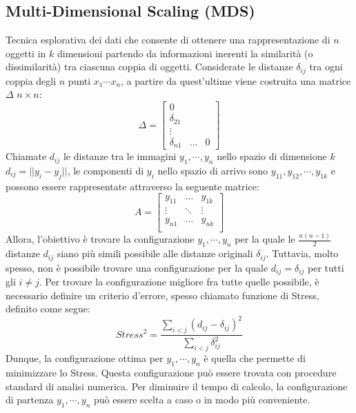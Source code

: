 \documentclass[11pt,a4paper,twocolumn]{article}
\begin{document}
\subsection{Multi-Dimensional Scaling (MDS)}
Tecnica esplorativa dei dati che consente di ottenere una rappresentazione di $n$ oggetti in $k$ dimensioni partendo da informazioni inerenti la similarità (o dissimilarità) tra  ciascuna coppia di oggetti. Considerate le distanze $ \delta_{ij} $ tra ogni coppia degli $n$ punti $x_1 \cdots x_n$, a partire da quest'ultime viene costruita una matrice $\Delta$ $n \times n$:
\begin{equation}
\nonumber
\Delta=\begin{bmatrix}
0\\
\delta_{21}  \\
\vdots   \\
\delta_{n1} & \dots & 0
\end{bmatrix}
\end{equation}
Chiamate $d_{ij}$ le distanze tra le immagini $ y_{1},\cdots,y_{n}$ nello spazio di dimensione $k$ $d_{ij}=\lvert\lvert{y_i-y_j}\lvert\lvert$, le componenti di $y_i$ nello spazio di arrivo sono $y_{11},y_{12},\cdots,y_{1k}$ e possono essere rappresentate attraverso la seguente matrice:
\begin{equation}
\nonumber
A = \begin{bmatrix}
y_{11}           & \dots         & y_{1k}         \\
\vdots   &  \ddots    & \vdots \\
y_{n1}          & \dots         & y_{nk}         \\
\end{bmatrix}
\end{equation}
Allora, l'obiettivo è trovare la configurazione $y_{1},\cdots,y_{n}$ per la quale le $\frac{n(n-1)}{2}$ distanze $d_{ij}$ siano più simili possibile alle distanze originali $\delta_{ij}$. Tuttavia, molto spesso, non è possibile trovare una configurazione per la quale $d_{ij} = \delta_{ij}$ per tutti gli $i \neq j$. Per trovare la configurazione migliore fra tutte quelle possibile, è necessario definire un criterio d'errore, spesso chiamato funzione di Stress, definito come segue:
\begin{equation}
\nonumber
Stress^2=\frac{\sum_{i<j}{(d_{ij}-\delta_{ij})^2}}{\sum_{i<j}{\delta_{ij}^2}}
\end{equation}
Dunque, la configurazione ottima per $y_1,\cdots,y_n$ è quella che permette di minimizzare lo Stress. Questa configurazione può essere trovata con  procedure standard di analisi numerica. Per diminuire il tempo di calcolo, la configurazione di partenza $y_1,\cdots,y_n$ può essere scelta a caso o in  modo più conveniente.
\end{document}
